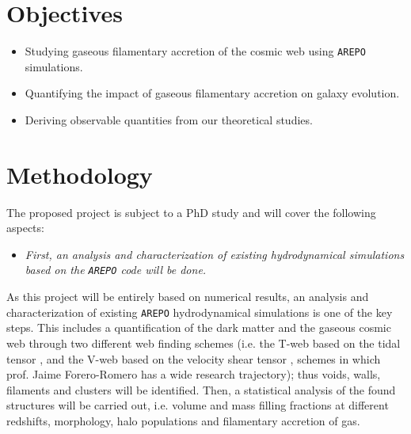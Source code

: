 \documentclass[a4,useAMS,usenatbib,usegraphicx,12pt]{article}
\begin{document}

\newpage
\section{Objectives}


\begin{itemize}

\item[\checkmark] Studying gaseous filamentary accretion of the cosmic web using 
\texttt{AREPO} simulations.

\item[\checkmark] Quantifying the impact of gaseous filamentary accretion on 
galaxy evolution.

\item[\checkmark] Deriving observable quantities from our theoretical studies.


\end{itemize}



\section{Methodology}


The proposed project is subject to a PhD study and will cover the following 
aspects:


\begin{itemize}

\item[\checkmark] \textit{First, an analysis and characterization of existing 
hydrodynamical simulations based on the \texttt{AREPO} code will be done.}

\end{itemize}


As this project will be entirely based on numerical results, an analysis and 
characterization of existing \texttt{AREPO} hydrodynamical simulations is one 
of the key steps. This includes a quantification of the dark matter and the 
gaseous cosmic web through two different web finding schemes (i.e. the T-web 
based on the tidal tensor \citep{Hahn07,Forero09}, and the V-web based on the 
velocity shear tensor \citep{Hoffman12}, schemes in which prof. Jaime 
Forero-Romero has a wide research trajectory); thus voids, walls, filaments 
and clusters will be identified. Then, a statistical analysis of the found 
structures will be carried out, i.e. volume and mass filling fractions at 
different redshifts, morphology, halo populations and filamentary accretion of 
gas.
\end{document}
